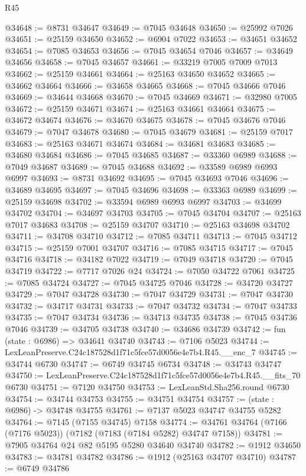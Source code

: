 \begin{lexlean}{R45}
\begin{coremodule}
{@34648 := @8731 @34647
@34649 := @7045 @34648
@34650 := @25992 @7026
@34651 := @25159 @34650
@34652 := @6904 @7022
@34653 := @34651 @34652
@34654 := @7085 @34653
@34656 := @7045 @34654 @7046
@34657 := @34649 @34656
@34658 := @7045 @34657
@34661 := @33219 @7005 @7009 @7013
@34662 := @25159 @34661
@34664 := @25163 @34650 @34652
@34665 := @34662 @34664
@34666 := @34658 @34665
@34668 := @7045 @34666 @7046
@34669 := @34644 @34668
@34670 := @7045 @34669
@34671 := @32980 @7005
@34672 := @25159 @34671
@34674 := @25163 @34661 @34664
@34675 := @34672 @34674
@34676 := @34670 @34675
@34678 := @7045 @34676 @7046
@34679 := @7047 @34678
@34680 := @7045 @34679
@34681 := @25159 @7017
@34683 := @25163 @34671 @34674
@34684 := @34681 @34683
@34685 := @34680 @34684
@34686 := @7045 @34685
@34687 := @33360 @6989
@34688 := @7049 @34687
@34689 := @7045 @34688
@34692 := @33589 @6989 @6993 @6997
@34693 := @8731 @34692
@34695 := @7045 @34693 @7046
@34696 := @34689 @34695
@34697 := @7045 @34696
@34698 := @33363 @6989
@34699 := @25159 @34698
@34702 := @33594 @6989 @6993 @6997
@34703 := @34699 @34702
@34704 := @34697 @34703
@34705 := @7045 @34704
@34707 := @25163 @7017 @34683
@34708 := @25159 @34707
@34710 := @25163 @34698 @34702
@34711 := @34708 @34710
@34712 := @7085 @34711
@34713 := @7045 @34712
@34715 := @25159 @7001 @34707
@34716 := @7085 @34715
@34717 := @7045 @34716
@34718 := @34182 @7022
@34719 := @7049 @34718
@34720 := @7045 @34719
@34722 := @7717 @7026 @24
@34724 := @7050 @34722 @7061
@34725 := @7085 @34724
@34727 := @7045 @34725 @7046
@34728 := @34720 @34727
@34729 := @7047 @34728
@34730 := @7047 @34729
@34731 := @7047 @34730
@34732 := @34717 @34731
@34733 := @7047 @34732
@34734 := @7047 @34733
@34735 := @7047 @34734
@34736 := @34713 @34735
@34738 := @7045 @34736 @7046
@34739 := @34705 @34738
@34740 := @34686 @34739
@34742 := fun (state : @6986) => @34641 @34740
@34743 := @7106 @5023
@34744 := LexLeanPreserve.C24c187528d1f71c5fce57d0056e4e7b4.R45.__enc_7
@34745 := @34744 @6730
@34747 := @6749 @34745 @6734
@34748 := @34743 @34747
@34750 := LexLeanPreserve.C24c187528d1f71c5fce57d0056e4e7b4.R45.__fits_70 @6730
@34751 := @7120 @34750
@34753 := LexLeanStd.Sha256.round @6730
@34754 := @34744 @34753
@34755 := @34751 @34754
@34757 := (state : @6986) -> @34748 @34755
@34761 := @7137 @5023 @34747 @34755 @5282
@34764 := @7145 (@7155 @34745) @7158
@34774 := @34761 @34764 (@7166 (@7176 @5023)) (@7182 (@7183 (@7184 @5282) @34747 @7158))
@34781 := @7905 @34764 @24 @82 @5195 @5280 @34640 @34740
@34782 := @1912 @34650
@34783 := @34781 @34782
@34786 := @1912 (@25163 @34707 @34710)
@34787 := @6749 @34786
}
\end{coremodule}
\end{lexlean}
